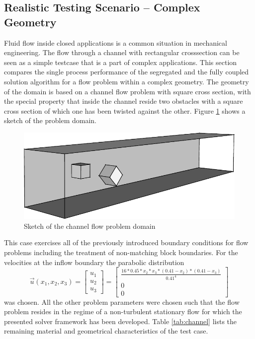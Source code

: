 \subsection{Realistic Testing Scenario -- Complex Geometry}

Fluid flow inside closed applications is a common situation in mechanical engineering. The flow through a channel with rectangular crosssection can be seen as a simple testcase that is a part of complex applications. This section compares the single process performance of the segregated and the fully coupled solution algorithm for a flow problem within a complex geometry. The geometry of the domain is based on a channel flow problem with square cross section, with the special property that inside the channel reside two obstacles with a square cross section of which one has been twisted against the other. Figure \ref{fig:sketch} shows a sketch of the problem domain. 

\begin{figure}
  \centering
  \includegraphics{./img/channel3d.pdf}
  \caption{Sketch of the channel flow problem domain}
  \label{fig:sketch}
\end{figure}

This case exercises all of the previously introduced boundary conditions for flow problems including the treatment of non-matching block boundaries. For the velocities at the inflow boundary the parabolic distribution
\begin{displaymath}
  \vec{u}(x_1,x_2,x_3) 
  =
\left[
  \begin{array}{ccc}
    u_1 \\
    u_2 \\
    u_3 
  \end{array}
\right]
  =
\left[
  \begin{array}{ccc}
    \frac{ 16 * 0.45 * x_2 * x_3 * \left( 0.41 - x_2 \right) * \left( 0.41 - x_3 \right)}{0.41^4}
    \\[0.9em]
    0 \\[0.3em]
    0 
  \end{array}
\right]
\end{displaymath}
was chosen. All the other problem parameters were chosen such that the flow problem resides in the regime of a non-turbulent stationary flow for which the presented solver framework has been developed. Table \ref{tab:channel} lists the remaining material and geometrical characteristics of the test case.

